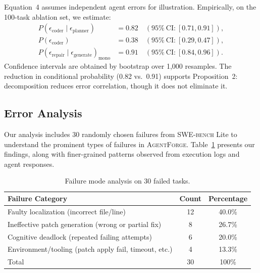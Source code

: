 \documentclass[journal]{IEEEtran}
\newcommand{\agentforge}{\textsc{AgentForge}}
\newcommand{\swebench}{\textsc{SWE-bench}}
\begin{document}
Equation~4 assumes independent agent errors for illustration. Empirically, on the 100-task ablation set, we estimate:
\begin{align}
  P(\epsilon_\text{coder} \mid \epsilon_\text{planner}) &= 0.82 \quad (95\%\ \text{CI:}\ [0.71, 0.91]), \\
  P(\epsilon_\text{coder})                              &= 0.38 \quad (95\%\ \text{CI:}\ [0.29, 0.47]), \\
  P(\epsilon_\text{repair} \mid \epsilon_\text{generate})_\text{mono} &= 0.91 \quad (95\%\ \text{CI:}\ [0.84, 0.96]).
\end{align}
Confidence intervals are obtained by bootstrap over 1,000 resamples. The reduction in conditional probability (0.82 vs.\ 0.91) supports Proposition~2: decomposition reduces error correlation, though it does not eliminate it.

\subsection{Error Analysis}
\label{sec:error}

Our analysis includes 30 randomly chosen failures from \swebench{} Lite to understand the prominent types of failures in \agentforge{}. Table~\ref{tab:errors} presents our findings, along with finer-grained patterns observed from execution logs and agent responses.

\begin{table}[t]
\centering
\caption{Failure mode analysis on 30 failed tasks.}
\label{tab:errors}
\begin{tabular}{lcc}
\toprule
Failure Category & Count & Percentage \\
\midrule
Faulty localization (incorrect file/line) & 12 & 40.0\% \\
Ineffective patch generation (wrong or partial fix) & 8 & 26.7\% \\
Cognitive deadlock (repeated failing attempts) & 6 & 20.0\% \\
Environment/tooling (patch apply fail, timeout, etc.) & 4 & 13.3\% \\
\midrule
Total & 30 & 100\% \\
\bottomrule
\end{tabular}
\end{table}
\end{document}
